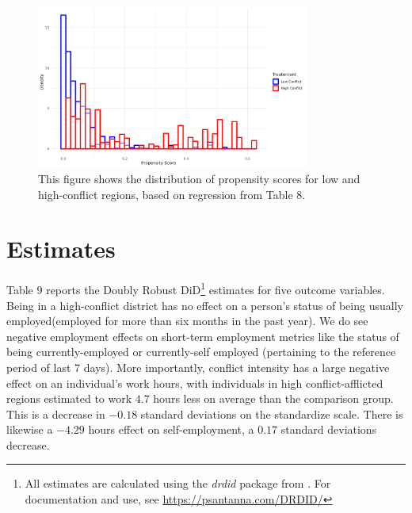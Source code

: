 \documentclass[12pt,a4paper]{article}
\begin{document}
\begin{figure}[H]
\centering
\includegraphics[width=0.8\textwidth]{../Analysis files/ps_overlap.jpg}
\caption{This figure shows the distribution of propensity scores for low and high-conflict regions, based on regression from Table 8.}
\label{fig:ps_overlap}
\end{figure}




\section{Estimates}

Table 9 reports the Doubly Robust DiD\footnote{All estimates are calculated using the \textit{drdid} package from \textcite{sant2020doubly}. For documentation and use, see \url{https://psantanna.com/DRDID/}} estimates for five outcome variables.
Being in a high-conflict district has no effect on a person's status of being usually employed(employed for more than six months in the past year). We do see negative employment effects on short-term employment metrics like the status of being currently-employed or currently-self employed (pertaining to the reference period of last 7 days). More importantly, conflict intensity has a large
negative effect on an individual's work hours, with individuals in high conflict-afflicted regions estimated to work $4.7$ hours less on average than the comparison group. This is a decrease in $-0.18$ standard deviations on the standardize scale. There is likewise a $-4.29$ hours effect on self-employment, a $0.17$ standard deviations decrease.


\end{document}
